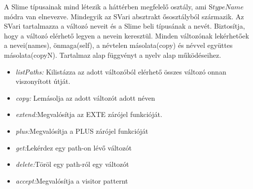{A Slime típusainak mind létezik a háttérben megfelelő osztály, ami S{$ typeName $} módra van elnevezve. 
Mindegyik az SVari absztrakt ősosztályból származik.
Az SVari tartalmazza a változó neveit és a Slime beli típusának a nevét.
Biztosítja, hogy a változó elérhető legyen a nevein keresztül.
Minden változónak lekérhetőek a nevei(names), önmaga(self), a névtelen másolata(copy) és névvel együttes másolata(copyN).
Tartalmaz alap függvényt a nyelv alap működéseihez. 
\begin{itemize}
\item \emph{listPaths:} Kilistázza az adott változóból elérhető összes változó onnan viszonyított útját.
\item \emph{copy:} Lemásolja az adott változót adott néven
\item \emph{extend:}Megvalósítja az EXTE zárójel funkcióját.
\item \emph{plus:}Megvalósítja a PLUS zárójel funkcióját
\item \emph{get:}Lekérdez egy path-on lévő változót
\item \emph{delete:}Töröl egy path-ról egy változót
\item \emph{accept:}Megvalósítja a visitor patternt
\end{itemize}

}
